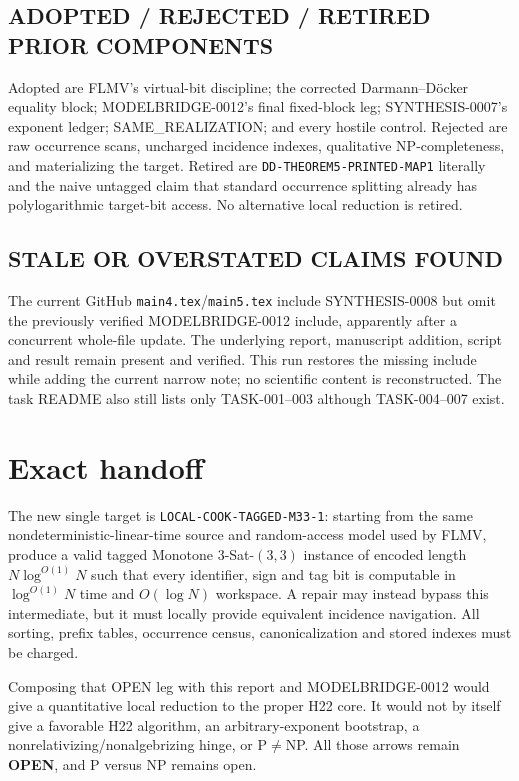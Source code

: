 \documentclass[11pt]{article}
\newcommand{\OPEN}{\textbf{OPEN}}
\begin{document}
\subsection*{ADOPTED / REJECTED / RETIRED PRIOR COMPONENTS}
Adopted are FLMV's virtual-bit discipline; the corrected
Darmann--D\"ocker equality block; MODELBRIDGE-0012's final fixed-block leg;
SYNTHESIS-0007's exponent ledger; SAME\_REALIZATION; and every hostile
control.  Rejected are raw occurrence scans, uncharged incidence indexes,
qualitative NP-completeness, and materializing the target.  Retired are
\texttt{DD-THEOREM5-PRINTED-MAP1} literally and the naive untagged claim that
standard occurrence splitting already has polylogarithmic target-bit access.
No alternative local reduction is retired.

\subsection*{STALE OR OVERSTATED CLAIMS FOUND}
The current GitHub \texttt{main4.tex}/\texttt{main5.tex} include
SYNTHESIS-0008 but omit the previously verified MODELBRIDGE-0012 include,
apparently after a concurrent whole-file update.  The underlying report,
manuscript addition, script and result remain present and verified.  This run
restores the missing include while adding the current narrow note; no
scientific content is reconstructed.  The task README also still lists only
TASK-001--003 although TASK-004--007 exist.

\section{Exact handoff}

The new single target is \texttt{LOCAL-COOK-TAGGED-M33-1}: starting from the
same nondeterministic-linear-time source and random-access model used by
FLMV, produce a valid tagged Monotone 3-Sat-$(3,3)$ instance of encoded
length $N\log^{O(1)}N$ such that every identifier, sign and tag bit is
computable in $\log^{O(1)}N$ time and $O(\log N)$ workspace.  A repair may
instead bypass this intermediate, but it must locally provide equivalent
incidence navigation.  All sorting, prefix tables, occurrence census,
canonicalization and stored indexes must be charged.

Composing that OPEN leg with this report and MODELBRIDGE-0012 would give a
quantitative local reduction to the proper H22 core.  It would not by itself
give a favorable H22 algorithm, an arbitrary-exponent bootstrap, a
nonrelativizing/nonalgebrizing hinge, or P$\ne$NP.  All those arrows remain
\OPEN, and P versus NP remains open.
\end{document}
